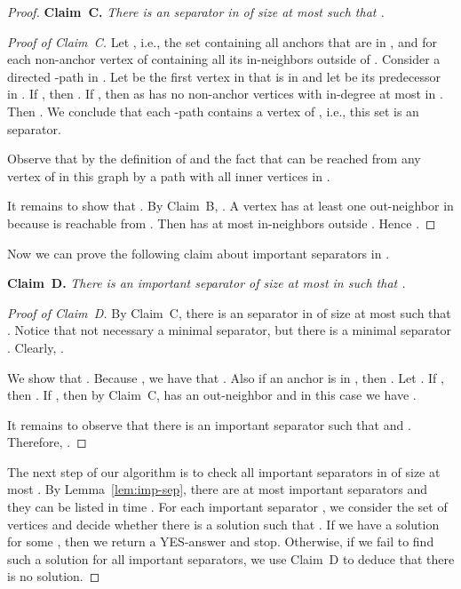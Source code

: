 \documentclass[11pt,a4paper]{article}
\begin{document}
\begin{proof}
\medskip
\noindent
{\bf Claim~C.} {\it
There is  an  separator  in  of size at most  such that
 .
}

\begin{proof}[Proof of Claim~C]
Let , i.e., the
set containing all anchors that are in , and for each non-anchor vertex of  containing all its
in-neighbors outside of . Consider a directed -path  in . Let  be the first vertex in  that is in
 and let  be its predecessor in . If , then . If , then  as  has no
non-anchor vertices with in-degree at most  in . Then . We conclude that each -path contains a vertex
of , i.e., this set is an  separator.

Observe that  by the definition of  and the fact that  can be reached from any
vertex of  in this graph by a path with all inner vertices in .

It remains to show that .  By Claim~B, . A
vertex  has at least one out-neighbor in  because  is reachable from . Then  has
at most  in-neighbors outside . Hence .
\end{proof}

Now we can prove the following claim about important  separators in .

\medskip
\noindent
{\bf Claim~D.} {\it
There is an important  separator  of size at most  in  such that .
}



\begin{proof}[Proof of Claim~D]
By Claim~C, there is an  separator  in  of size at most  such that . Notice that  not necessary a minimal separator, but there is a minimal  separator
. Clearly, .

We show that  .  
Because , we have that . Also if an anchor 
is in  , then . Let . If , then .
If  , then by Claim~C,  has an out-neighbor  and in this case we have .

It remains to observe that there is an important  separator  such that  and
. Therefore, .
\end{proof}

The next step of our algorithm is to check all important  separators in  of size at most  . By
Lemma~\ref{lem:imp-sep}, there are at most  important  separators and they can be listed in time
. For each important  separator , we consider the set of vertices  and decide whether there is a solution such that . If we have a solution for some , then we return
a YES-answer and stop. Otherwise, if we fail  to find such a solution for all important separators, we use
Claim~D  to deduce that there is no solution.


\end{proof}
\end{document}
